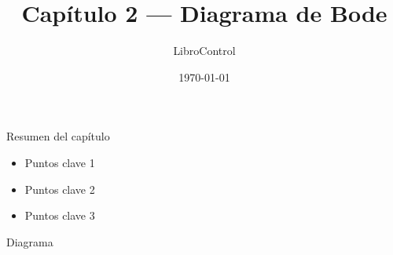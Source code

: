 \documentclass{beamer}
\title{Capítulo 2 — Diagrama de Bode}
\author{LibroControl}
\date{\today}
\begin{document}
\begin{frame}
  \titlepage
\end{frame}

\begin{frame}{Resumen del capítulo}
  \begin{itemize}
    \item Puntos clave 1
    \item Puntos clave 2
    \item Puntos clave 3
  \end{itemize}
\end{frame}

\begin{frame}{Diagrama}
  \centering
\end{frame}
\end{document}
